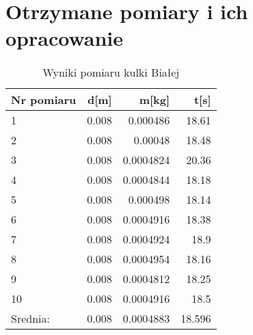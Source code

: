 \documentclass{article}
\begin{document}
\section{Otrzymane pomiary i ich opracowanie}


\begin{center}
    \begin{table}[h]
        \caption{Wyniki pomiaru kulki Białej}
        \centering
        \begin{tabular}{|l|r|r|r|}
            \hline
            Nr pomiaru & d[m] & m[kg] & t[s] \\ \hline
            1 & 0.008 & 0.000486  & 18.61 \\ \hline
            2 & 0.008 & 0.00048   & 18.48 \\ \hline
            3 & 0.008 & 0.0004824 & 20.36 \\ \hline
            4 & 0.008 & 0.0004844 & 18.18 \\ \hline
            5 & 0.008 & 0.000498  & 18.14 \\ \hline
            6 & 0.008 & 0.0004916 & 18.38 \\ \hline
            7 & 0.008 & 0.0004924 & 18.9  \\ \hline
            8 & 0.008 & 0.0004954 & 18.16 \\ \hline
            9 & 0.008 & 0.0004812 & 18.25 \\ \hline
            10& 0.008 & 0.0004916 & 18.5  \\ \hline
            Srednia: & 0.008 & 0.0004883 & 18.596 \\ \hline
        \end{tabular}%
        \label{tab:Tabela Pomiarow Kulki Bialej}%
    \end{table}%
\end{center}

\vspace{-10ex}
\end{document}
